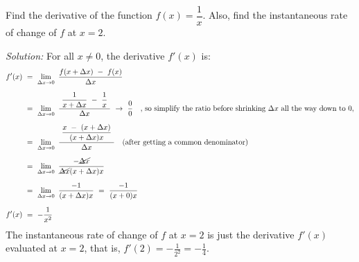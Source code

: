 \begin{exmp}
 Find the derivative of the function $f(x) = \dfrac{1}{x}$. Also, find the
 instantaneous rate of change of $f$ at $x=2$.\vspace{1mm}
 \par\noindent\emph{Solution:} For all $x \ne 0$, the derivative $f'(x)$ is:
 \begin{align*}
  f'(x) ~&=~ \lim_{\Delta x \to 0} ~\frac{f(x+\Delta x) ~-~ f(x)}
   {\Delta x}\\[6pt]
  &=~ \lim_{\Delta x \to 0} ~\frac{~\dfrac{1}{x + \Delta x} ~-~ \dfrac{1}{x}~}
      {\Delta x} ~\rightarrow~ \frac{0}{0}\quad\text{, so simplify the ratio
   before shrinking $\Delta x$ all the way down to $0$,}\\[6pt]
  &=~ \lim_{\Delta x \to 0} ~\frac{~\dfrac{x ~-~ (x + \Delta x)}
      {(x + \Delta x)x}~}{\Delta x}
      \quad\text{(after getting a common denominator)}\\[6pt]
  &=~ \lim_{\Delta x \to 0} ~\frac{-\cancel{\Delta x}}{\cancel{\Delta x}(x + \Delta x)x}\\[6pt]
  &=~ \lim_{\Delta x \to 0} ~\frac{-1}{(x + \Delta x)x} ~=~
      \frac{-1}{(x+0)x}\\[6pt]
  f'(x) ~&=~ -\frac{1}{x^2}
 \end{align*}
 The instantaneous rate of change of $f$ at $x=2$ is just the derivative $f'(x)$
 evaluated at $x=2$, that is, $f'(2) = -\frac{1}{2^2} = -\frac{1}{4}$.
\end{exmp}
\divider
\vspace{3mm}

